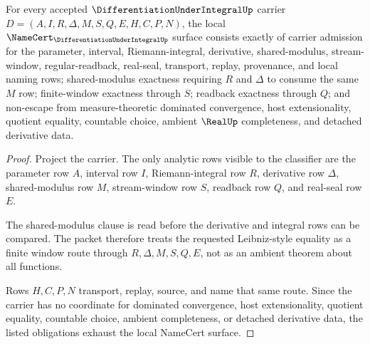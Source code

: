 \begin{theorem}
\label{thm:differentiation-under-integral-namecert-obligations}
For every accepted $\DifferentiationUnderIntegralUp$ carrier $D=(A,I,R,\Delta,M,S,Q,E,H,C,P,N)$, the local $\NameCert_{\DifferentiationUnderIntegralUp}$ surface consists exactly of carrier admission for the parameter, interval, Riemann-integral, derivative, shared-modulus, stream-window, regular-readback, real-seal, transport, replay, provenance, and local naming rows; shared-modulus exactness requiring $R$ and $\Delta$ to consume the same $M$ row; finite-window exactness through $S$; readback exactness through $Q$; and non-escape from measure-theoretic dominated convergence, host extensionality, quotient equality, countable choice, ambient $\RealUp$ completeness, and detached derivative data.
\end{theorem}
\begin{proof}
Project the carrier. The only analytic rows visible to the classifier are the parameter row $A$, interval row $I$, Riemann-integral row $R$, derivative row $\Delta$, shared-modulus row $M$, stream-window row $S$, readback row $Q$, and real-seal row $E$.

The shared-modulus clause is read before the derivative and integral rows can be compared. The packet therefore treats the requested Leibniz-style equality as a finite window route through $R,\Delta,M,S,Q,E$, not as an ambient theorem about all functions.

Rows $H,C,P,N$ transport, replay, source, and name that same route. Since the carrier has no coordinate for dominated convergence, host extensionality, quotient equality, countable choice, ambient completeness, or detached derivative data, the listed obligations exhaust the local NameCert surface.
\end{proof}

